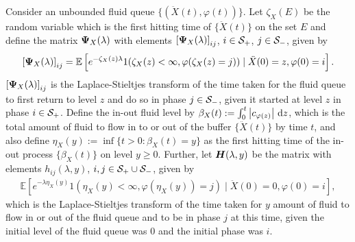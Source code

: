 Consider an unbounded fluid queue \(\{(\ddot X(t), \varphi(t))\}\). Let \(\zeta_X(E)\) be the random variable which is the first hitting time of \(\{\ddot X(t)\}\) on the set \(E\) and define the matrix \(\boldsymbol \Psi_X(\lambda)\) with elements \(\left[\boldsymbol \Psi_X(\lambda)\right]_{ij}\), \(i\in\mathcal{S}_+\), \(j\in\mathcal{S}_-\), given by
\begin{align}
	\left[\boldsymbol \Psi_X(\lambda)\right]_{ij} = \mathbb E\left[ e^{-\zeta_X(z)\lambda} 1(\zeta_X(z)<\infty, \varphi(\zeta_X(z)=j))\mid \ddot X(0)=z, \varphi(0)=i\right].
\end{align}
\(\left[\boldsymbol \Psi_X(\lambda)\right]_{ij}\) is the Laplace-Stieltjes transform of the time taken for the fluid queue to first return to level \(z\) and do so in phase \(j\in\mathcal{S}_-\), given it started at level \(z\) in phase \(i\in\mathcal{S}_+\). Define the in-out fluid level by $\beta_X(t) := \int_0^t \left| c_{\varphi(z)} \right|  \, \mathrm{d} z$, which is the total amount of fluid to flow in to or out of the buffer \(\{\ddot X(t)\}\) by time \(t\), and also define $\eta_X(y) := \inf \{t > 0: \beta_X(t) = y\}$ as the first hitting time of the in-out process \(\{\beta_X(t)\}\) on level \(y\geq 0\). Further, let \(\boldsymbol H(\lambda,y)\) be the matrix with elements \(h_{ij}(\lambda,y)\), \(i,j\in\mathcal{S}_+\cup\mathcal{S}_-\), given by
\begin{align}
	\mathbb E\left[e^{-\lambda \eta_X(y)}1(\eta_X(y)<\infty,\varphi(\eta_X(y))=j)\mid \ddot X(0)=0, \varphi(0)=i\right],
\end{align}
which is the Laplace-Stieltjes transform of the time taken for \(y\) amount of fluid to flow in or out of the fluid queue and to be in phase \(j\) at this time, given the initial level of the fluid queue was \(0\) and the initial phase was \(i\). 

